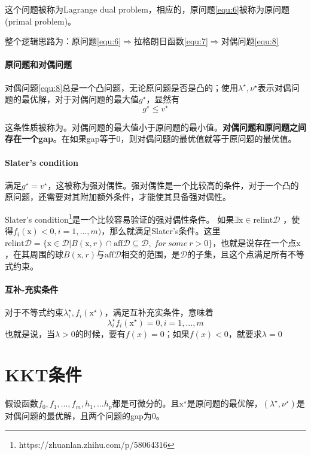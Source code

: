 \documentclass[a4paper]{D:/MyRepo/Script/latex/PaperReadingLog}
\begin{document}
这个问题被称为Lagrange dual problem，相应的，原问题\ref{equ:6}被称为原问题(primal problem)。

整个逻辑思路为：原问题\ref{equ:6}$\Rightarrow$拉格朗日函数\ref{equ:7}$\Rightarrow$对偶问题\ref{equ:8}

\paragraph{原问题和对偶问题}
对偶问题\ref{equ:8}总是一个凸问题，无论原问题是否是凸的；使用$\lambda^\star,\nu^\star$表示对偶问题的最优解，对于对偶问题的最大值$g^\star$，显然有
$$
g^\star\le v^\star
$$

这条性质被称为。对偶问题的最大值小于原问题的最小值。\textbf{对偶问题和原问题之间存在一个gap}。在如果gap等于0，则对偶问题的最优值就等于原问题的最优值。

\paragraph{Slater's condition}
满足$g^\star=v^\star$，这被称为强对偶性。强对偶性是一个比较高的条件，对于一个凸的原问题，还需要对其附加额外条件，才能使其具备强对偶性。

Slater's condition\footnote{https://zhuanlan.zhihu.com/p/58064316}是一个比较容易验证的强对偶性条件。
如果$\exists \mathrm{x}\in\mathrm{relint}\mathcal{D}$ ，使得$f_i(\mathrm{x})<0,i=1,...,m)$，那么就满足Slater's条件。这里$\mathrm{relint}\mathcal{D}=\{\mathrm{x}\in\mathcal{D}|B(\mathrm{x},r)\cap \mathrm{aff}\mathcal{D}\subseteq\mathcal{D},\ for\ some\ r>0\}$，也就是说存在一个点$\mathrm{x}$，在其周围的球$B(\mathrm{x},r)$与$\mathrm{aff}\mathcal{D}$相交的范围，是$\mathcal{D}$的子集，且这个点满足所有不等式约束。

\paragraph{互补-充实条件}
对于不等式约束$\lambda_i^\star,f_i(\mathrm{x}^\star)$，满足互补充实条件，意味着
$$
\lambda_i^\star f_i(\mathrm{x}^\star)=0,i=1,...,m
$$
也就是说，当$\lambda>0$的时候，要有$f(x)=0$；如果$f(x)<0$，就要求$\lambda=0$

\section{KKT条件}
假设函数$f_0,f_1,...,f_m,h_1,...h_p$都是可微分的。且$\mathrm{x}^\star$是原问题的最优解，$(\lambda^\star,\nu^\star)$是对偶问题的最优解，且两个问题的gap为0。
\end{document}
